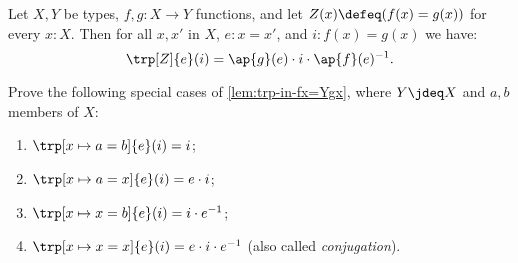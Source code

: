 \begin{lemma}\label{lem:trp-in-fx=Ygx}
Let $X,Y$ be types, $f,g: X\to Y$ functions, and let
$Z(x)\defeq (f(x)=g(x))$ for every $x:X$.
Then for all $x,x'$ in $X$, $e: x=x'$, and $i: f(x)=g(x)$ we have:
\[
\trp[Z]{ e} (i) = \ap{g}(e) \cdot i \cdot \ap{f}(e)^{-1}.
\]
\end{lemma}

\begin{xca}\label{xca:trp-in-a/x=b/x}
Prove the following special cases of \cref{lem:trp-in-fx=Ygx},
where $Y\jdeq X$ and $a,b$ members of $X$:
\begin{enumerate}
\item $\trp[x\mapsto a=b]{e} (i) = i$;
\item\label{trp-in-a=x} $\trp[x\mapsto a=x]{e} (i) = e\cdot i$;
\item\label{trp-in-x=a} $\trp[x\mapsto x=b]{e} (i) = i \cdot e^{-1}$;
\item\label{trp-in-x=x} $\trp[x\mapsto x=x]{e} (i) = e \cdot i\cdot e^{-1}$
(also called \emph{conjugation}).\qedhere
\end{enumerate}
\end{xca}

